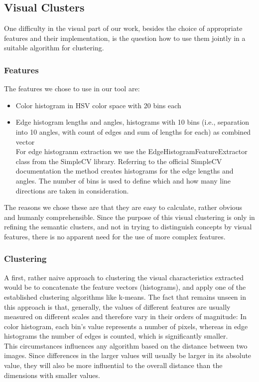 \subsection{Visual Clusters}
\label{sec_visualclustering}

One difficulty in the visual part of our work, besides the choice of appropriate features and their implementation, is the question how to use them jointly in a suitable algorithm for clustering.

\subsubsection{Features}
The features we chose to use in our tool are:
\begin{itemize}
\item{Color histogram} in HSV color space with 20 bins each
\item{Edge histogram} lengths and angles, histograms with 10 bins (i.e., separation into 10 angles, with count of edges and sum of lengths for each) as combined vector 
\\
For edge histogranm extraction we use the EdgeHistogramFeatureExtractor class from the SimpleCV library. Referring to the official SimpleCV documentation   the method creates histograms for the edge lengths and angles. The number of bins is used to define which and how many line directions are taken in consideration.
\end{itemize}
The reasons we chose these are that they are easy to calculate, rather obvious and humanly comprehensible. Since the purpose of this visual clustering is only in refining the semantic clusters, and not in trying to distinguish concepts by visual features, there is no apparent need for the use of more complex features. \\


\subsubsection{Clustering}
A first, rather naive approach to clustering the visual characteristics extracted would be to concatenate the feature vectors (histograms), and apply one of the established clustering algorithms like k-means.  The fact that remains unseen in this approach is that, generally, the values of different features are usually measured on different scales and therefore vary in their orders of magnitude: In color histogram, each bin's value represents a number of pixels, whereas in edge histograms the number of edges is counted, which is significantly smaller. \\
This circumstances influences any algorithm based on the distance between two images. Since differences in the larger values will usually be larger in its absolute value, they will also be more influential to the overall distance than the dimensions with smaller values.

